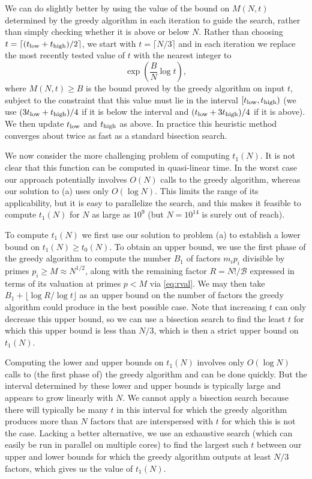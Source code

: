 \documentclass[10pt,a4paper,reqno]{amsart}
\numberwithin{equation}{section}
\theoremstyle{plain}
\theoremstyle{definition}
\newcommand\tuple{{\mathcal B}}
\begin{document}
We can do slightly better by using the value of the bound on $M(N,t)$ determined by the greedy algorithm in each iteration to guide the search, rather than simply checking whether it is above or below $N$.  Rather than choosing $t=\lceil(t_{\rm low}+t_{\rm high})/2\rceil$, we start with $t=\lceil N/3\rceil$ and in each iteration we replace the most recently tested value of $t$ with the nearest integer to
\[
\exp\left(\frac{B}{N}\log t\right),
\]
where $M(N,t)\ge B$ is the bound proved by the greedy algorithm on input $t$,  subject to the constraint that this value must lie in the interval $[t_{\rm low},t_{\rm high})$
(we use $(3t_{\rm low}+t_{\rm high})/4$ if it is below the interval and $(t_{\rm low}+3t_{\rm high})/4$ if it is above).  We then update $t_{\rm low}$ and $t_{\rm high}$ as above.
In practice this heuristic method converges about twice as fast as a standard bisection search.

We now consider the more challenging problem of computing $t_1(N)$.  It is not clear that this function can be computed in quasi-linear time.  In the worst case our approach potentially involves $O(N)$ calls to the greedy algorithm, whereas our solution to (a) uses only $O(\log N)$.  This limits the range of its applicability, but it is easy to parallelize the search, and this makes it feasible to compute $t_1(N)$ for $N$ as large as $10^9$ (but $N=10^{14}$ is surely out of reach).

To compute $t_1(N)$ we first use our solution to problem (a) to establish a lower bound on $t_1(N)\ge t_0(N)$.  To obtain an upper bound, we use the first phase of the greedy algorithm to compute the number $B_1$ of factors $m_ip_i$ divisible by primes $p_i\ge M\approx N^{1/2}$, along with the remaining factor $R=N!/\tuple$ expressed in terms of its valuation at primes $p < M$ via \eqref{eq:rval}.
We may then take $B_1 + \lfloor \log R / \log t\rfloor$ as an upper bound on the number of factors the greedy algorithm could produce in the best possible case. Note that increasing $t$ can only decrease this upper bound, so we can use a bisection search to find the least $t$ for which this upper bound is less than $N/3$, which is then a strict upper bound on $t_1(N)$.

Computing the lower and upper bounds on $t_1(N)$ involves only $O(\log N)$ calls to (the first phase of) the greedy algorithm and can be done quickly.  But the interval determined by these lower and upper bounds is typically large and appears to grow linearly with $N$.  We cannot apply a bisection search because there will typically be many $t$ in this interval for which the greedy algorithm produces more than $N$ factors that are interspersed with $t$ for which this is not the case.  Lacking a better alternative, we use an exhaustive search (which can easily be run in parallel on multiple cores) to find the largest such $t$ between our upper and lower bounds for which the greedy algorithm outputs at least $N/3$ factors, which gives us the value of $t_1(N)$.
\end{document}
